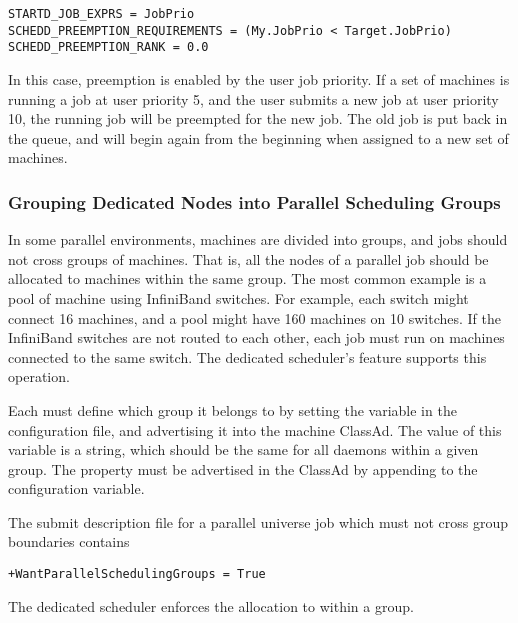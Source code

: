 \begin{verbatim}
STARTD_JOB_EXPRS = JobPrio
SCHEDD_PREEMPTION_REQUIREMENTS = (My.JobPrio < Target.JobPrio)
SCHEDD_PREEMPTION_RANK = 0.0
\end{verbatim}

In this case, preemption is enabled by the user job priority. If a set
of machines is running a job at user priority 5, and the user submits
a new job at user priority 10, the running job will be preempted for
the new job.  The old job is put back in the queue, and will begin again
from the beginning when assigned to a new set of machines.

\subsubsection{\label{sec:Configure-Dedicated-Groups}
Grouping Dedicated Nodes into Parallel Scheduling Groups}

In some parallel environments, machines are divided into groups, and
jobs should not cross groups of machines.
That is, all the nodes of a parallel
job should be allocated to machines within the same group.  
The most common example is a pool of machine using InfiniBand switches.
For example, 
each switch might connect 16 machines, 
and a pool might have 160 machines on 10 switches.
If the InfiniBand switches are not routed to each other, 
each job must run on machines connected to the same switch.
The dedicated scheduler's 
 feature supports this operation.

Each  must define which group it belongs to by setting the 
 variable in the configuration file, and 
advertising it into the machine ClassAd.  
The value of this variable is a string,
which should be the same for all  daemons within a given group.
The property must be advertised in the  ClassAd
by appending 
to the  configuration variable.

The submit description file for a parallel universe job which
must not cross group boundaries contains 
\begin{verbatim}
+WantParallelSchedulingGroups = True
\end{verbatim}

The dedicated scheduler enforces the allocation to within a group.
